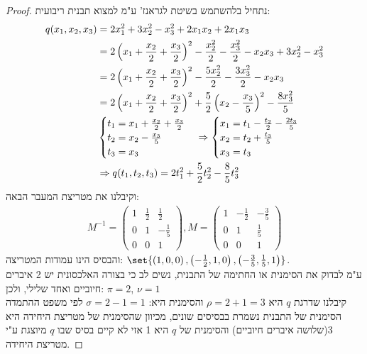 \documentclass{article}
\DeclarePairedDelimiter\set\{\}
\begin{document}
\begin{proof}
    נתחיל בלהשתמש בשיטת לגראנז' ע"מ למצוא תבנית ריבועית:
    \begin{align*}
        q(x_1, x_2, x_3)
        &= 2x_1^2 + 3x_2^2 - x_3^2 + 2x_1x_2 + 2x_1x_3 \\
        &= 2\left( x_1 + \frac{x_2}{2} + \frac{x_3}{2} \right)^2 - \frac{x_2^2}{2} - \frac{x_3^2}{2} - x_2x_3 + 3x_2^2 - x_3^2 \\
        &= 2\left( x_1 + \frac{x_2}{2} + \frac{x_3}{2} \right)^2 - \frac{5x_2^2}{2} - \frac{3x_3^2}{2} - x_2x_3 \\
        &= 2\left( x_1 + \frac{x_2}{2} + \frac{x_3}{2} \right)^2 + \frac{5}{2}\left( x_2 - \frac{x_3}{5} \right)^2 - \frac{8x_3^2}{5} \\
        &\begin{cases}
            t_1 = x_1 + \frac{x_2}{2} + \frac{x_3}{2} \\
            t_2 = x_2 - \frac{x_3}{5} \\
            t_3 = x_3
            \end{cases} \Rightarrow
            \begin{cases}
                x_1 = t_1 - \frac{t_2}{2} - \frac{2t_3}{5} \\
                x_2 = t_2 + \frac{t_3}{5} \\
                x_3 = t_3
            \end{cases} \\
            &\Rightarrow q(t_1, t_2, t_3) = 2t_1^2 + \frac{5}{2}t_2^2 - \frac{8}{5}t_3^2
                \end{align*}
                וקיבלנו את מטריצת המעבר הבאה:
                \begin{align*}
                    M^{-1} = \begin{pmatrix}
                        1 & \frac{1}{2} & \frac{1}{2} \\
                        0 & 1 & -\frac{1}{5} \\
                        0 & 0 & 1
                \end{pmatrix},
                M = \begin{pmatrix}
                    1 & -\frac{1}{2} & -\frac{3}{5} \\
                    0 & 1 & \frac{1}{5} \\
                    0 & 0 & 1
                    \end{pmatrix}
        \end{align*}
        והבסיס הינו עמודות המטריצה: $\set{\brac{1,0,0}, \brac{-\frac{1}{2},1,0}, \brac{-\frac{3}{5},\frac{1}{5},1}}$. \\
        ע"מ לבדוק את הסימנית או החתימה של התבנית, נשים לב כי בצורה האלכסונית יש 2 איברים חיוביים ואחד שלילי, ולכן: $\pi=2$, $\nu=1$ \\
        קיבלנו שדרגת $q$ היא $\rho = 2 + 1 = 3$ והסימנית היא: $\sigma = 2 - 1 = 1$
        לפי משפט ההתמדה הסימנית של התבנית נשמרת בבסיסים שונים, מכיוון שהסימנית של מטריצת היחידה היא 3(שלושה איברים חיוביים)
        והסימנית של $q$ היא 1 אזי לא קיים בסיס שבו $q$ מיוצגת ע"י מטריצת היחידה.
    \end{proof}
\end{document}
